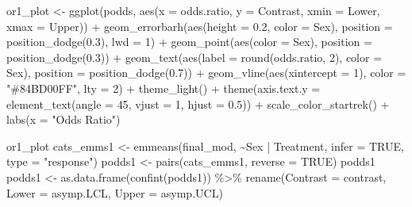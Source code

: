 \documentclass[12pt]{article}
\newenvironment{Shaded}{\begin{snugshade}}{\end{snugshade}}
\newcommand{\AttributeTok}[1]{\textcolor[rgb]{0.77,0.63,0.00}{#1}}
\newcommand{\ConstantTok}[1]{\textcolor[rgb]{0.00,0.00,0.00}{#1}}
\newcommand{\DecValTok}[1]{\textcolor[rgb]{0.00,0.00,0.81}{#1}}
\newcommand{\FloatTok}[1]{\textcolor[rgb]{0.00,0.00,0.81}{#1}}
\newcommand{\FunctionTok}[1]{\textcolor[rgb]{0.00,0.00,0.00}{#1}}
\newcommand{\NormalTok}[1]{#1}
\newcommand{\OtherTok}[1]{\textcolor[rgb]{0.56,0.35,0.01}{#1}}
\newcommand{\SpecialCharTok}[1]{\textcolor[rgb]{0.00,0.00,0.00}{#1}}
\newcommand{\StringTok}[1]{\textcolor[rgb]{0.31,0.60,0.02}{#1}}
\begin{document}
\begin{Shaded}
\begin{Highlighting}[]
\NormalTok{or1\_plot }\OtherTok{\textless{}{-}} \FunctionTok{ggplot}\NormalTok{(podds, }\FunctionTok{aes}\NormalTok{(}\AttributeTok{x =}\NormalTok{ odds.ratio, }\AttributeTok{y =}\NormalTok{ Contrast, }\AttributeTok{xmin =}\NormalTok{ Lower, }\AttributeTok{xmax =}\NormalTok{ Upper)) }\SpecialCharTok{+}
  \FunctionTok{geom\_errorbarh}\NormalTok{(}\FunctionTok{aes}\NormalTok{(}\AttributeTok{height =} \FloatTok{0.2}\NormalTok{, }\AttributeTok{color =}\NormalTok{ Sex),}
                 \AttributeTok{position =} \FunctionTok{position\_dodge}\NormalTok{(}\FloatTok{0.3}\NormalTok{), }\AttributeTok{lwd =} \DecValTok{1}\NormalTok{) }\SpecialCharTok{+}
  \FunctionTok{geom\_point}\NormalTok{(}\FunctionTok{aes}\NormalTok{(}\AttributeTok{color =}\NormalTok{ Sex), }\AttributeTok{position =} \FunctionTok{position\_dodge}\NormalTok{(}\FloatTok{0.3}\NormalTok{)) }\SpecialCharTok{+}
  \FunctionTok{geom\_text}\NormalTok{(}\FunctionTok{aes}\NormalTok{(}\AttributeTok{label =} \FunctionTok{round}\NormalTok{(odds.ratio, }\DecValTok{2}\NormalTok{), }\AttributeTok{color =}\NormalTok{ Sex), }\AttributeTok{position =} \FunctionTok{position\_dodge}\NormalTok{(}\FloatTok{0.7}\NormalTok{)) }\SpecialCharTok{+} 
  \FunctionTok{geom\_vline}\NormalTok{(}\FunctionTok{aes}\NormalTok{(}\AttributeTok{xintercept =} \DecValTok{1}\NormalTok{), }\AttributeTok{color =} \StringTok{"\#84BD00FF"}\NormalTok{, }\AttributeTok{lty =} \DecValTok{2}\NormalTok{) }\SpecialCharTok{+}
  \FunctionTok{theme\_light}\NormalTok{() }\SpecialCharTok{+}
  \FunctionTok{theme}\NormalTok{(}\AttributeTok{axis.text.y =} \FunctionTok{element\_text}\NormalTok{(}\AttributeTok{angle =} \DecValTok{45}\NormalTok{, }\AttributeTok{vjust =} \DecValTok{1}\NormalTok{, }\AttributeTok{hjust =} \FloatTok{0.5}\NormalTok{)) }\SpecialCharTok{+}
  \FunctionTok{scale\_color\_startrek}\NormalTok{() }\SpecialCharTok{+}
  \FunctionTok{labs}\NormalTok{(}\AttributeTok{x =} \StringTok{"Odds Ratio"}\NormalTok{)}

\NormalTok{or1\_plot}
\NormalTok{cats\_emms1 }\OtherTok{\textless{}{-}} \FunctionTok{emmeans}\NormalTok{(final\_mod, }\SpecialCharTok{\textasciitilde{}}\NormalTok{Sex }\SpecialCharTok{|}\NormalTok{ Treatment, }\AttributeTok{infer =} \ConstantTok{TRUE}\NormalTok{, }\AttributeTok{type =} \StringTok{"response"}\NormalTok{)}
\NormalTok{podds1 }\OtherTok{\textless{}{-}} \FunctionTok{pairs}\NormalTok{(cats\_emms1, }\AttributeTok{reverse =} \ConstantTok{TRUE}\NormalTok{)}
\NormalTok{podds1}
\NormalTok{podds1 }\OtherTok{\textless{}{-}} \FunctionTok{as.data.frame}\NormalTok{(}\FunctionTok{confint}\NormalTok{(podds1)) }\SpecialCharTok{\%\textgreater{}\%}
  \FunctionTok{rename}\NormalTok{(}\AttributeTok{Contrast =}\NormalTok{ contrast, }\AttributeTok{Lower =}\NormalTok{ asymp.LCL, }\AttributeTok{Upper =}\NormalTok{ asymp.UCL)}


\end{Highlighting}
\end{Shaded}
\end{document}
